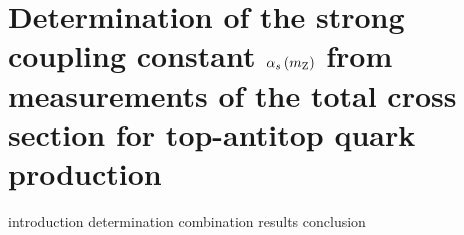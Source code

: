 \section{Determination of the strong coupling constant \texorpdfstring{$\alpha_s \left( m_\mathrm{Z} \right) $}{alpha_s(mZ)} from measurements of the total cross section for top-antitop quark production}

\newcommand{\cell}[2]{ \makecell{\parbox{#1}{\centering\strut #2}} }
\newcommand{\lcell}[2]{ \makecell{\parbox{#1}{\strut #2}} }
\newcommand{\scell}[2]{ \makecell{\parbox{#1}{\strut #2}} }

\newcommand{\rf}{\text{ref}}

\newcommand{\alphasResultCenter}{0.1177}        %
\newcommand{\alphasResultLeftError}{0.0036}     %
\newcommand{\alphasResultRightError}{0.0034}    %
\newcommand{\alphasResultLeftPercentage}{3.1}   %
\newcommand{\alphasResultRightPercentage}{2.9}  %
\newcommand{\alphasResultSymmPercentage}{3.0}   %

{introduction}
{determination}
{combination}
{results}
{conclusion}

